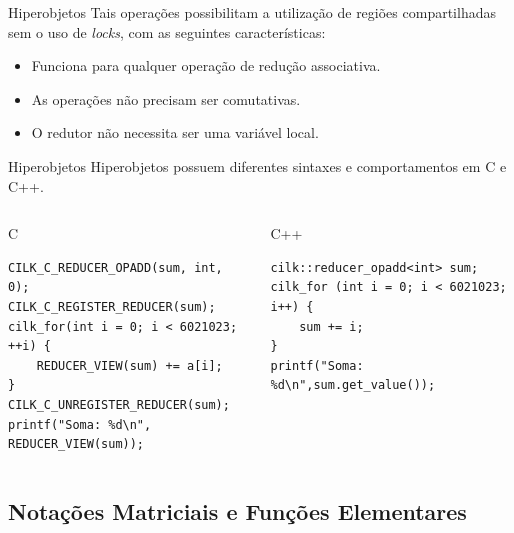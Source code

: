 \documentclass{beamer}
\begin{document}
\begin{frame}[fragile]{Hiperobjetos}
    Tais operações possibilitam a utilização de regiões compartilhadas sem o uso de \textit{locks}, com as seguintes características:
    \begin{itemize}
	    \item Funciona para qualquer operação de redução associativa.
	    \item As operações não precisam ser comutativas.
        \item O redutor não necessita ser uma variável local.
    \end{itemize}
\end{frame}

\begin{frame}[fragile]{Hiperobjetos}
    Hiperobjetos possuem diferentes sintaxes e comportamentos em C e C++.
\begin{columns}[T]
\begin{column}{0.4\textwidth}
\begin{tiny}
\begin{block}{C}
\begin{lstlisting}
CILK_C_REDUCER_OPADD(sum, int, 0);
CILK_C_REGISTER_REDUCER(sum);
cilk_for(int i = 0; i < 6021023; ++i) {
    REDUCER_VIEW(sum) += a[i];
}
CILK_C_UNREGISTER_REDUCER(sum);
printf("Soma: %d\n", REDUCER_VIEW(sum));
\end{lstlisting}
\end{block}
\end{tiny}
\end{column}

\begin{column}{0.4\textwidth}

\begin{tiny}
\begin{block}{C++}
\begin{lstlisting}
cilk::reducer_opadd<int> sum;
cilk_for (int i = 0; i < 6021023; i++) {
    sum += i;
}
printf("Soma: %d\n",sum.get_value());
\end{lstlisting}
\end{block}
\end{tiny}

\end{column}
\end{columns}
\end{frame}

\subsection{Notações Matriciais e Funções Elementares}
\end{document}
